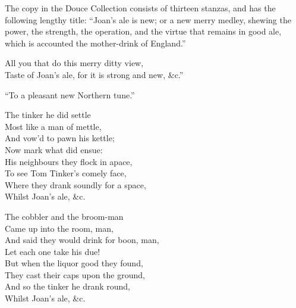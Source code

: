 The copy in the Douce Collection consists of thirteen stanzas, and has the
following lengthy title: “Joan’s ale is new; or a new merry medley, shewing
the power, the strength, the operation, and the virtue that remains in good ale,
which is accounted the mother-drink of England.”
\settowidth{\versewidth}{All you that do this merry ditty view}
\begin{scverse}
All you that do this merry ditty view,\\
Taste of Joan’s ale, for it is strong and new, \&c.”
\end{scverse}

“To a pleasant new Northern tune.”



\pagebreak

\settowidth{\versewidth}{Where they drank soundly for a space}
\begin{dcverse}\begin{patverse}
The tinker he did settle\\
Most like a man of mettle,\\
And vow’d to pawn his kettle;\\
Now mark what did ensue:\\
His neighbours they flock in apace,\\
To see Tom Tinker’s comely face,\\
Where they drank soundly for a space,\\
Whilst Joan’s ale, \&c.
\end{patverse}

\settowidth{\versewidth}{And said they would drink for boon, man,}
\begin{patverse}
The cobbler and the broom-man\\
Came up into the room, man,\\
And said they would drink for boon, man,\\
Let each one take his due!\\
But when the liquor good they found,\\
They cast their caps upon the ground,\\
And so the tinker he drank round,\\
Whilst Joan’s ale, \&c.
\end{patverse}
\end{dcverse}

